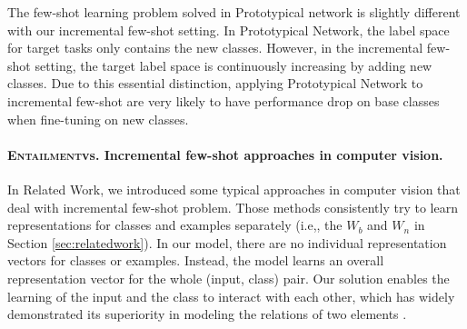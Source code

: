 \documentclass[11pt]{article}
\newcommand{\modelname}{\textsc{Entailment}}
\begin{document}
The few-shot learning problem solved in Prototypical network is slightly different with our incremental few-shot setting. In Prototypical Network, the label space for target tasks only contains the new classes. However, in the incremental few-shot setting, the target label space is continuously increasing by adding new classes. Due to this essential distinction, applying Prototypical Network to incremental few-shot are very likely to have performance drop on base classes when fine-tuning on new classes.


\paragraph{\modelname\enspace vs. Incremental few-shot approaches in computer vision.} In Related Work, we introduced some typical approaches in computer vision that deal with incremental few-shot problem. Those methods consistently try to learn representations for classes and examples separately (i.e,, the $W_b$ and $W_n$ in Section \ref{sec:relatedwork}). In our model, there are no individual representation vectors for classes or examples. 
Instead, the model learns an overall representation vector for the whole (input, class) pair. Our solution enables the learning of the input and the class to interact with each other, which has widely demonstrated its superiority in modeling the relations of two elements \cite{DBLP12808,zhangdiscriminative}.
\end{document}
